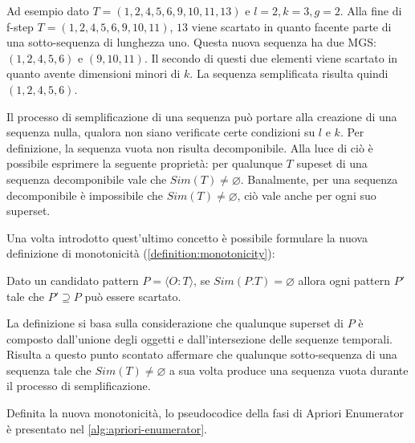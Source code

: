 Ad esempio dato \(T = (1,2,4,5,6,9,10,11,13)\) e \(l = 2, k = 3, g = 2\).
Alla fine di f-step \(T = (1,2,4,5,6,9,10,11)\), \(13\) viene scartato in quanto facente parte di una sotto-sequenza di lunghezza uno. 
Questa nuova sequenza ha due MGS: \((1,2,4,5,6)\) e \((9,10,11)\).
Il secondo di questi due elementi viene scartato in quanto avente dimensioni minori di \(k\).
La sequenza semplificata risulta quindi \((1,2,4,5,6)\).

Il processo di semplificazione di una sequenza può portare alla creazione di una sequenza nulla, qualora non siano verificate certe condizioni su \(l\) e \(k\).
Per definizione, la sequenza vuota non risulta decomponibile.
Alla luce di ciò è possibile esprimere la seguente proprietà: 
per qualunque \(T\) supeset di una sequenza decomponibile vale che \(Sim(T) \neq \varnothing\).
Banalmente, per una sequenza decomponibile è impossibile che  \(Sim(T) \neq \varnothing\), ciò vale anche per ogni suo superset.

Una volta introdotto quest'ultimo concetto è possibile formulare la nuova definizione di monotonicità (\cref{definition:monotonicity}):

\begin{definition}[Monotonicità]\label{definition:monotonicity}

Dato un candidato pattern \(P = \langle O:T \rangle\), se \(Sim(P.T) = \varnothing\) allora ogni pattern \(P'\) tale che \(P' \supseteq P\) può essere scartato.

\end{definition}

La definizione si basa sulla considerazione che qualunque superset di \(P\) è composto dall'unione degli oggetti e dall'intersezione delle sequenze temporali.
Risulta a questo punto scontato affermare che qualunque sotto-sequenza di una sequenza tale che \(Sim(T) \neq \varnothing\) a sua volta produce una sequenza vuota durante il processo di semplificazione.

Definita la nuova monotonicità, lo pseudocodice della fasi di Apriori Enumerator è presentato nel \cref{alg:apriori-enumerator}.

